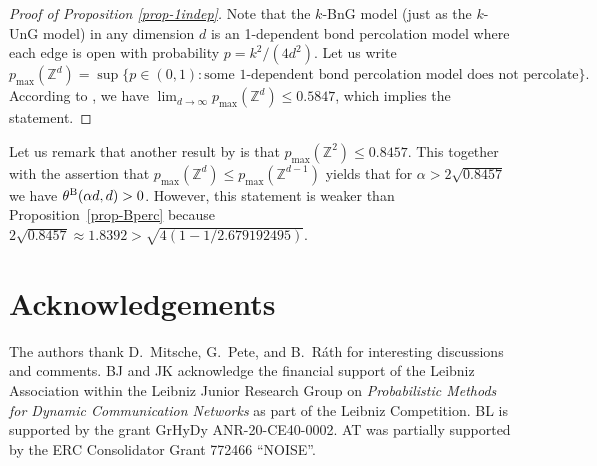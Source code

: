 \documentclass[a4paper, oneside, 11pt]{amsart}
\theoremstyle{definition}
\newcommand{\1}{\mathbbm{1}}
\newcommand{\0}{\mathbf{o}}
\newcommand{\Z}{\mathbb{Z}}
\numberwithin{equation}{section}
\begin{document}
\begin{proof}[Proof of Proposition \ref{prop-1indep}]
Note that the $k$-BnG model (just as the $k$-UnG model) in any dimension $d$ is an 1-dependent  bond percolation model where each edge is open with probability $p=k^2/(4d^2)$. Let us write 
\[ p_{\max}(\Z^d)= \sup \{ p \in (0,1) \colon \text{some 1-dependent bond percolation model does not percolate} \}. \]
According to \cite{improvedLB}, we have 
 $\lim_{d\to\infty} p_{\max}(\Z^d) \leq 0.5847$, which implies the statement.
\end{proof}

Let us remark that another result by \cite{improvedLB} is that $p_{\max}(\Z^2) \leq 0.8457$. This together with the assertion that $p_{\max}(\Z^d) \leq p_{\max}(\Z^{d-1})$ yields that for $\alpha>2\sqrt{0.8457}$ we have $\theta^{\rm B}(\alpha d, d)>0$. However, this statement is weaker than Proposition~\ref{prop-Bperc} because $2\sqrt{0.8457} \approx 1.8392 > \sqrt{4(1-1/2.679192495)}$. 

\section*{Acknowledgements}
The authors thank D.~Mitsche, G.~Pete, and B.~Ráth for interesting discussions and comments. BJ and JK acknowledge the financial support of the Leibniz Association within the Leibniz Junior Research Group on \textit{Probabilistic Methods for Dynamic Communication Networks} as part of the Leibniz Competition. BL is supported by the grant GrHyDy ANR-20-CE40-0002. AT  was partially supported by the ERC Consolidator Grant 772466 ``NOISE''.



\end{document}
